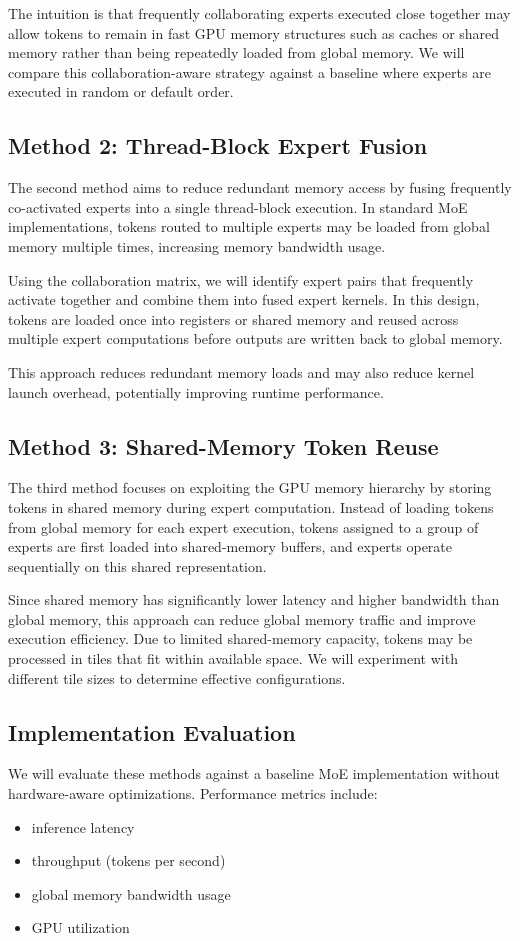 \documentclass{article} %
\begin{document}
The intuition is that frequently collaborating experts executed close together may allow tokens to remain in fast GPU memory structures such as caches or shared memory rather than being repeatedly loaded from global memory. We will compare this collaboration-aware strategy against a baseline where experts are executed in random or default order.

\subsection{Method 2: Thread-Block Expert Fusion}
The second method aims to reduce redundant memory access by fusing frequently co-activated experts into a single thread-block execution. In standard MoE implementations, tokens routed to multiple experts may be loaded from global memory multiple times, increasing memory bandwidth usage.

Using the collaboration matrix, we will identify expert pairs that frequently activate together and combine them into fused expert kernels. In this design, tokens are loaded once into registers or shared memory and reused across multiple expert computations before outputs are written back to global memory.

This approach reduces redundant memory loads and may also reduce kernel launch overhead, potentially improving runtime performance.

\subsection{Method 3: Shared-Memory Token Reuse}
The third method focuses on exploiting the GPU memory hierarchy by storing tokens in shared memory during expert computation. Instead of loading tokens from global memory for each expert execution, tokens assigned to a group of experts are first loaded into shared-memory buffers, and experts operate sequentially on this shared representation.

Since shared memory has significantly lower latency and higher bandwidth than global memory, this approach can reduce global memory traffic and improve execution efficiency. Due to limited shared-memory capacity, tokens may be processed in tiles that fit within available space. We will experiment with different tile sizes to determine effective configurations.

\subsection{Implementation Evaluation}
We will evaluate these methods against a baseline MoE implementation without hardware-aware optimizations. Performance metrics include:
\begin{itemize}
\item inference latency
\item throughput (tokens per second)
\item global memory bandwidth usage
\item GPU utilization
\end{itemize}
\end{document}
